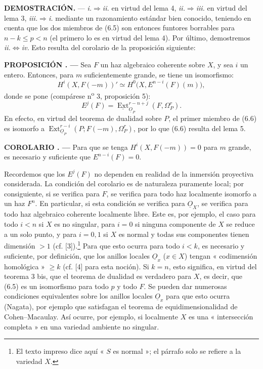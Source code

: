 \documentclass[11pt,twoside,openany]{book}
\numberwithin{equation}{section}
\newcommand{\src}[1]{%
  \phantomsection\hypertarget{src:#1}{}%
  \marginpar{\raggedleft\footnotesize\sffamily #1}%
}
\newcommand{\Osh}{\underline{O}}
\newcommand{\Extsh}{\underline{\operatorname{Ext}}}
\theoremstyle{plain}
\theoremstyle{definition}
\theoremstyle{remark}
\newcommand{\result}[2]{%
  \par\medskip\noindent\textbf{#1%
  \if\relax\detokenize{#2}\relax\else\space#2\fi. ---}\enspace
}
\newcommand{\FgaUnitKey}{frontmatter}
\renewcommand{\src}[1]{%
  \phantomsection\hypertarget{src:\FgaUnitKey:#1}{}%
  \marginpar{\raggedleft\footnotesize\sffamily #1}%
}
\theoremstyle{plain}
\theoremstyle{definition}
\theoremstyle{remark}
\begin{document}
\noindent\textbf{DEMOSTRACIÓN.} --- \textit{i.}$\Rightarrow$\textit{ii.} en
virtud del lema 4, \textit{ii.}$\Rightarrow$\textit{iii.} en virtud del lema 3,
\textit{iii.}$\Rightarrow$\textit{i.} mediante un razonamiento estándar bien conocido,
teniendo en cuenta que los dos miembros de (6.5) son entonces funtores borrables
para $n-k\leq p<n$ (el primero lo es en virtud del lema 4). Por último, demostremos
\textit{ii.}$\Leftrightarrow$\textit{iv.} Esto resulta del corolario de la
proposición siguiente:

\result{PROPOSICIÓN}{6} Sea $F$ un haz algebraico coherente sobre $X$, y
sea $i$ un entero. Entonces, para $m$ suficientemente grande, se tiene un isomorfismo:
\begin{equation}\tag{6.6}
  H^{i}(X,F(-m))'
  \simeq H^{0}\bigl(X,E^{n-i}(F)(m)\bigr),
\end{equation}
donde se pone (compárese n\textsuperscript{o} 3, proposición 5):
\begin{equation}\tag{6.7}
  E^{j}(F)=\Extsh_{\Osh_P}^{r-n+j}(F,\Omega_P^{r}).
\end{equation}
En efecto, en virtud del teorema de dualidad sobre $P$, el primer miembro de (6.6)
es isomorfo a
$\operatorname{Ext}_{\Osh_P}^{r-i}(P;F(-m),\Omega_P^{r})$, por lo que (6.6) resulta
del lema 5.

\src{187}
\result{COROLARIO}{} Para que se tenga $H^{i}(X,F(-m))=0$ para $m$ grande, es
necesario y suficiente que $E^{n-i}(F)=0$.

Recordemos que los $E^{j}(F)$ no dependen en realidad de la inmersión proyectiva
considerada. La condición del corolario es de naturaleza puramente local; por consiguiente,
si se verifica para $F$, se verifica para todo haz localmente
isomorfo a un haz $F^{n}$. En particular, si esta condición se verifica
para $\Osh_X$, se verifica para todo haz algebraico coherente localmente
libre. Este es, por ejemplo, el caso para todo $i<n$ si $X$ es no singular, para
$i=0$ si ninguna componente de $X$ se reduce a un solo punto, y para $i=0,1$
si $X$ es normal y todas sus componentes tienen dimensión $>1$ (cf.
[3]).\footnote{El texto impreso dice aquí « $S$ es normal »; el párrafo
solo se refiere a la variedad $X$.} Para que esto ocurra para todo
$i<k$, es necesario y suficiente, por definición, que los anillos locales
$\Osh_x$ ($x\in X$) tengan « codimensión homológica » $\geq k$ (cf. [4]
para esta noción). Si $k=n$, esto significa, en virtud del teorema 3 bis, que el
teorema de dualidad es verdadero para $X$, es decir, que (6.5) es un isomorfismo para
todo $p$ y todo $F$. Se pueden dar numerosas condiciones equivalentes sobre
los anillos locales $\Osh_x$ para que esto ocurra (Nagata), por ejemplo que
satisfagan el teorema de equidimensionalidad de Cohen--Macaulay. Así ocurre,
por ejemplo, si localmente $X$ es una « intersección completa » en una
variedad ambiente no singular.
\end{document}
